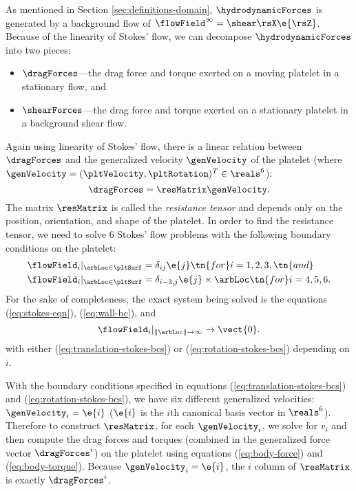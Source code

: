 As mentioned in Section \ref{sec:definitions-domain},
$\hydrodynamicForces$ is generated by a background flow of
$\flowField^\infty = \shear \rsX \e{\rsZ}$. Because of the linearity
of Stokes' flow, we can decompose $\hydrodynamicForces$ into two
pieces:
\begin{itemize}
\item $\dragForces$---the drag force and torque exerted on a moving
  platelet in a stationary flow, and
\item $\shearForces$---the drag force and torque exerted on a
  stationary platelet in a background shear flow.
\end{itemize}
Again using linearity of Stokes' flow, there is a linear relation
between $\dragForces$ and the generalized velocity $\genVelocity$ of
the platelet (where
$\genVelocity = (\pltVelocity, \pltRotation)^T \in \reals^6$):
\begin{equation}
  \label{eq:resistance-matrix}
  \dragForces = \resMatrix \genVelocity.
\end{equation}
The matrix $\resMatrix$ is called the \emph{resistance tensor} and
depends only on the position, orientation, and shape of the
platelet. In order to find the resistance tensor, we need to solve 6
Stokes' flow problems with the following boundary conditions on the
platelet:
\begin{align}
  \flowField_i |_{\arbLoc \in \pltSurf} &= \delta_{ij} \e{j} \tn{
  for } i = 1, 2, 3, \tn{ and} \label{eq:translation-stokes-bcs} \\
  \flowField_i |_{\arbLoc \in \pltSurf} &= \delta_{i-3, j} \e{j}
  \times \arbLoc \tn{ for } i = 4, 5,
  6. \label{eq:rotation-stokes-bcs}
\end{align}
For the sake of completeness, the exact system being solved is the
equations (\ref{eq:stokes-eqn}), (\ref{eq:wall-bc}), and
\begin{equation}
  \flowField_i |_{\|\arbLoc\| \rightarrow \infty} \rightarrow
  \vect{0}. \label{eq:far-field-drag}
\end{equation}
with either (\ref{eq:translation-stokes-bcs}) or
(\ref{eq:rotation-stokes-bcs}) depending on $i$.

With the boundary conditions specified in equations
(\ref{eq:translation-stokes-bcs}) and (\ref{eq:rotation-stokes-bcs}),
we have six different generalized velocities: $\genVelocity_i = \e{i}$
($\e{i}$ is the $i$th canonical basis vector in $\reals^6$). Therefore
to construct $\resMatrix$, for each $\genVelocity_i$, we solve for
$v_i$ and then compute the drag forces and torques (combined in the
generalized force vector $\dragForces^i$) on the platelet using
equations (\ref{eq:body-force}) and (\ref{eq:body-torque}). Because
$\genVelocity_i = \e{i}$, the $i$ column of $\resMatrix$ is exactly
$\dragForces^i$.

